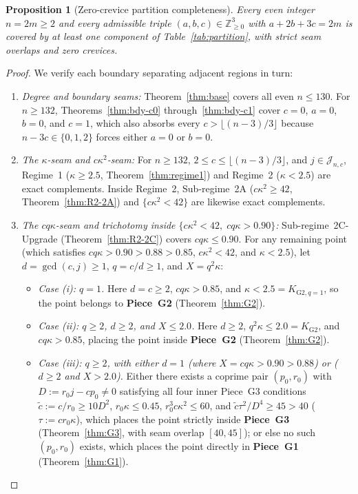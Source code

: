 \documentclass[10pt]{article}
\numberwithin{equation}{section}
\theoremstyle{plain}
\newtheorem{proposition}[theorem]{Proposition}
\theoremstyle{definition}
\newcommand{\Z}{\mathbb{Z}}
\newcommand{\1}{\mathbf{1}}
\begin{document}
\begin{proposition}[Zero-crevice partition completeness]\label{prop:zero-crevice}
Every even integer $n = 2m \ge 2$ and every admissible triple $(a, b, c) \in \Z_{\ge 0}^3$ with $a + 2b + 3c = 2m$ is covered by at least one component of Table~\ref{tab:partition}, with strict seam overlaps and zero crevices.
\end{proposition}

\begin{proof}
We verify each boundary separating adjacent regions in turn:
\begin{enumerate}[label=(\arabic*)]
    \item \emph{Degree and boundary seams:} Theorem~\ref{thm:base} covers all even $n \le 130$. For $n \ge 132$, Theorems~\ref{thm:bdy-c0} through~\ref{thm:bdy-c1} cover $c = 0$, $a = 0$, $b = 0$, and $c = 1$, which also absorbs every $c > \lfloor (n - 3)/3 \rfloor$ because $n - 3c \in \{0, 1, 2\}$ forces either $a = 0$ or $b = 0$.
    \item \emph{The $\kappa$-seam and $c\kappa^2$-seam:} For $n \ge 132$, $2 \le c \le \lfloor (n - 3)/3 \rfloor$, and $j \in \mathcal{J}_{n,c}$, Regime~1 ($\kappa \ge 2.5$, Theorem~\ref{thm:regime1}) and Regime~2 ($\kappa < 2.5$) are exact complements. Inside Regime~2, Sub-regime~2A ($c\kappa^2 \ge 42$, Theorem~\ref{thm:R2-2A}) and $\{c\kappa^2 < 42\}$ are likewise exact complements.
    \item \emph{The $c q \kappa$-seam and trichotomy inside $\{c\kappa^2 < 42,\; c q \kappa > 0.90\}$:} Sub-regime~2C-Upgrade (Theorem~\ref{thm:R2-2C}) covers $c q \kappa \le 0.90$. For any remaining point (which satisfies $c q \kappa > 0.90 > 0.88 > 0.85$, $c\kappa^2 < 42$, and $\kappa < 2.5$), let $d = \gcd(c, j) \ge 1$, $q = c/d \ge 1$, and $X = q^2\kappa$:
    \begin{itemize}[leftmargin=1.5em]
        \item \emph{Case (i): $q = 1$.} Here $d = c \ge 2$, $c q \kappa > 0.85$, and $\kappa < 2.5 = K_{\mathrm{G2}, q=1}$, so the point belongs to \textbf{Piece~G2} (Theorem~\ref{thm:G2}).
        \item \emph{Case (ii): $q \ge 2$, $d \ge 2$, and $X \le 2.0$.} Here $d \ge 2$, $q^2\kappa \le 2.0 = K_{\mathrm{G2}}$, and $c q \kappa > 0.85$, placing the point inside \textbf{Piece~G2} (Theorem~\ref{thm:G2}).
        \item \emph{Case (iii): $q \ge 2$, with either $d = 1$ (where $X = c q \kappa > 0.90 > 0.88$) or ($d \ge 2$ and $X > 2.0$).} Either there exists a coprime pair $(p_0, r_0)$ with $D := r_0 j - c p_0 \ne 0$ satisfying all four inner Piece~G3 conditions $\tilde{c} := c/r_0 \ge 10 D^2$, $r_0\kappa \le 0.45$, $r_0^3 c\kappa^2 \le 60$, and $\tilde{c}\tau^2/D^4 \ge 45 > 40$ ($\tau := c r_0 \kappa$), which places the point strictly inside \textbf{Piece~G3} (Theorem~\ref{thm:G3}, with seam overlap $[40, 45]$); or else no such $(p_0, r_0)$ exists, which places the point directly in \textbf{Piece~G1} (Theorem~\ref{thm:G1}).

\end{itemize}
\end{enumerate}
\end{proof}
\end{document}
